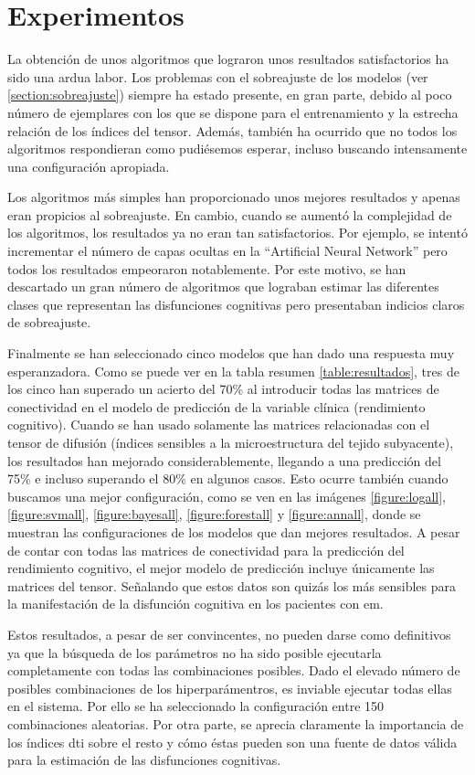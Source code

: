 
\section{Experimentos}
La obtención de unos algoritmos que lograron unos resultados satisfactorios ha sido una ardua labor. Los problemas con el sobreajuste de los modelos (ver \ref{section:sobreajuste}) siempre ha estado presente, en gran parte, debido al poco número de ejemplares con los que se dispone para el entrenamiento y la estrecha relación de los índices del tensor. Además, también ha ocurrido que no todos los algoritmos respondieran como pudiésemos esperar, incluso buscando intensamente una configuración apropiada. 

Los algoritmos más simples han proporcionado unos mejores resultados y apenas eran propicios al sobreajuste. En cambio, cuando se aumentó la complejidad de los algoritmos, los resultados ya no eran tan satisfactorios. Por ejemplo, se intentó incrementar el número de capas ocultas en la ``Artificial Neural Network'' pero todos los resultados empeoraron notablemente. Por este motivo, se han descartado un gran número de algoritmos que lograban estimar las diferentes clases que representan las disfunciones cognitivas pero presentaban indicios claros de sobreajuste.

Finalmente se han seleccionado cinco modelos que han dado una respuesta muy esperanzadora. Como se puede ver en la tabla resumen \ref{table:resultados}, tres de los cinco han superado un acierto del 70\% al introducir todas las matrices de conectividad en el modelo de predicción de  la variable clínica (rendimiento cognitivo). Cuando se han usado solamente las matrices relacionadas con el tensor de difusión (índices sensibles a la microestructura del tejido subyacente), los resultados han mejorado considerablemente, llegando a una predicción del 75\% e incluso superando el 80\% en algunos casos. Esto ocurre también cuando buscamos una mejor configuración, como se ven en las imágenes 
\ref{figure:logall}, 
\ref{figure:svmall}, 
\ref{figure:bayesall}, 
\ref{figure:forestall} y
\ref{figure:annall}, donde se muestran las configuraciones de los modelos que dan mejores resultados.  A pesar de contar con todas las matrices de conectividad para la predicción del rendimiento cognitivo, el mejor modelo de predicción incluye únicamente las matrices del tensor. Señalando que estos datos son quizás los más sensibles para la manifestación de la disfunción cognitiva en los pacientes con \gls{em}.

Estos resultados, a pesar de ser convincentes, no pueden darse como definitivos ya que la búsqueda de los parámetros no ha sido posible ejecutarla completamente con todas las combinaciones posibles. Dado el elevado número de posibles combinaciones de los hiperparámentros, es inviable ejecutar todas ellas en el sistema. Por ello se ha seleccionado la configuración entre 150 combinaciones aleatorias. Por otra parte, se aprecia claramente la importancia de los índices \gls{dti} sobre el resto y cómo éstas pueden son una fuente de datos válida para la estimación de las disfunciones cognitivas.

